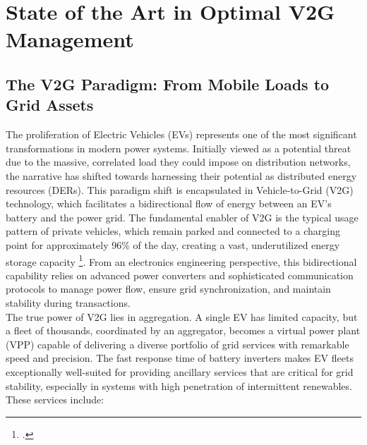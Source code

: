 \chapter{State of the Art in Optimal V2G Management}
\label{chap:state_of_the_art}

\section{The V2G Paradigm: From Mobile Loads to Grid Assets}
The proliferation of Electric Vehicles (EVs) represents one of the most significant transformations in modern power systems. Initially viewed as a potential threat due to the massive, correlated load they could impose on distribution networks, the narrative has shifted towards harnessing their potential as distributed energy resources (DERs). This paradigm shift is encapsulated in Vehicle-to-Grid (V2G) technology, which facilitates a bidirectional flow of energy between an EV's battery and the power grid. The fundamental enabler of V2G is the typical usage pattern of private vehicles, which remain parked and connected to a charging point for approximately 96\% of the day, creating a vast, underutilized energy storage capacity \footcite{evertsson2024investigating}. From an electronics engineering perspective, this bidirectional capability relies on advanced power converters and sophisticated communication protocols to manage power flow, ensure grid synchronization, and maintain stability during transactions.
\\
The true power of V2G lies in aggregation. A single EV has limited capacity, but a fleet of thousands, coordinated by an aggregator, becomes a virtual power plant (VPP) capable of delivering a diverse portfolio of grid services with remarkable speed and precision. The fast response time of battery inverters makes EV fleets exceptionally well-suited for providing ancillary services that are critical for grid stability, especially in systems with high penetration of intermittent renewables. These services include:
